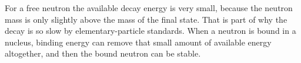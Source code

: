 For a free neutron the available decay energy is very small, because the neutron mass is only slightly above the mass of the final state. That is part of why the decay is so slow by elementary-particle standards. When a neutron is bound in a nucleus, binding energy can remove that small amount of available energy altogether, and then the bound neutron can be stable.

\begin{classroomqa}
\end{classroomqa}
